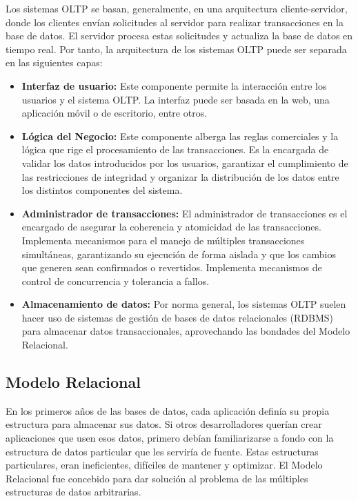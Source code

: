 Los sistemas OLTP se basan, generalmente, en una arquitectura cliente-servidor, donde los clientes envían solicitudes al servidor para 
realizar transacciones en la base de datos. El servidor procesa estas solicitudes y actualiza la base de datos en tiempo 
real. Por tanto, la arquitectura de los 
sistemas OLTP puede ser separada en las siguientes capas\cite{oltpAzure}:

\begin{itemize}
    \item \textbf{Interfaz de usuario:} Este componente permite la interacci\'on entre los usuarios y el sistema OLTP. La interfaz puede ser basada 
        en la web, una aplicaci\'on m\'ovil o de escritorio, entre otros.

    \item \textbf{Lógica del Negocio:} Este componente alberga las reglas comerciales y la lógica 
        que rige el procesamiento de las transacciones. Es la encargada de validar los datos introducidos por los usuarios, 
        garantizar el cumplimiento de las restricciones de integridad y organizar la distribuci\'on de los datos entre los 
        distintos componentes del sistema.

    \item \textbf{Administrador de transacciones:} El administrador de transacciones es el encargado de asegurar 
        la coherencia y atomicidad de las transacciones. Implementa mecanismos para el manejo de múltiples transacciones 
        simultáneas, garantizando su ejecuci\'on de forma aislada y que los cambios que generen sean confirmados o 
        revertidos. Implementa mecanismos de control de concurrencia y tolerancia a fallos.

    \item \textbf{Almacenamiento de datos:} Por norma general, los sistemas OLTP suelen hacer uso de sistemas de gestión
        de bases de datos relacionales (RDBMS) para almacenar datos transaccionales, aprovechando las bondades del 
        Modelo Relacional.
\end{itemize}

\subsection{Modelo Relacional}

En los primeros años de las bases de datos, cada aplicaci\'on defin\'ia su propia estructura para almacenar sus datos. 
Si otros desarrolladores querían crear aplicaciones que usen esos datos, primero deb\'ian familiarizarse a fondo con 
la estructura de datos particular que les servir\'ia de fuente. Estas estructuras particulares, eran ineficientes, difíciles
de mantener y optimizar. El Modelo Relacional fue concebido para dar soluci\'on al problema de las m\'ultiples estructuras 
de datos arbitrarias.

